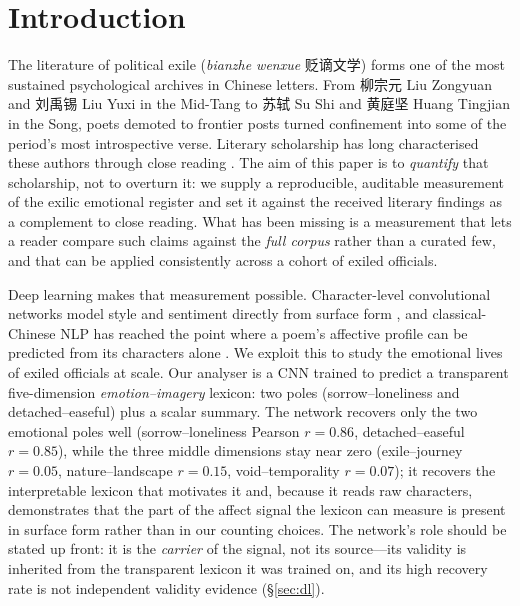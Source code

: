 \documentclass[10pt]{article}
\begin{document}
\section{Introduction}
\label{sec:intro}
The literature of political exile (\emph{bianzhe wenxue} 贬谪文学) forms one of the
most sustained psychological archives in Chinese letters. From 柳宗元 Liu Zongyuan
and 刘禹锡 Liu Yuxi in the Mid-Tang to 苏轼 Su Shi and 黄庭坚 Huang Tingjian in the
Song, poets demoted to frontier posts turned confinement into some of the period's
most introspective verse. Literary scholarship has long characterised these authors
through close reading \citep{shang2007exiled,xing2024liusu}. The aim of this paper is
to \emph{quantify} that scholarship, not to overturn it: we supply a reproducible,
auditable measurement of the exilic emotional register and set it against the
received literary findings as a complement to close reading. What has been missing
is a measurement that lets a reader compare such claims against the \emph{full corpus}
rather than a curated few, and that can be applied consistently across a cohort of
exiled officials.

Deep learning makes that measurement possible. Character-level convolutional
networks model style and sentiment directly from surface form
\citep{kim2014convolutional}, and classical-Chinese NLP has reached the point where
a poem's affective profile can be predicted from its characters alone
\citep{hou2015sentiment,du2025multimodal}. We exploit this to study the emotional
lives of exiled officials at scale. Our analyser is a CNN trained to predict a
transparent five-dimension \emph{emotion--imagery} lexicon: two poles
(sorrow--loneliness and detached--easeful) plus a scalar summary. The network
recovers only the two emotional poles well (sorrow--loneliness Pearson
$r{=}0.86$, detached--easeful $r{=}0.85$), while the three middle dimensions stay
near zero (exile--journey $r{=}0.05$, nature--landscape $r{=}0.15$,
void--temporality $r{=}0.07$); it recovers the interpretable lexicon that motivates
it and, because it reads raw characters, demonstrates that the part of the affect
signal the lexicon can measure is present in surface form rather than in our
counting choices. The network's role should be stated up front: it is the
\emph{carrier} of the signal, not its source---its validity is inherited from the
transparent lexicon it was trained on, and its high recovery rate is not independent
validity evidence (\S\ref{sec:dl}).
\end{document}

